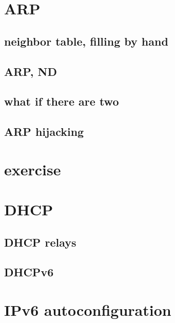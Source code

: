 \section{ARP}

\subsection{neighbor table, filling by hand}


\subsection{ARP, ND}



\subsection{what if there are two}



\subsection{ARP hijacking}




\section{exercise}


\section{DHCP}


\subsection{DHCP relays}


\subsection{DHCPv6}


\section{IPv6 autoconfiguration}



